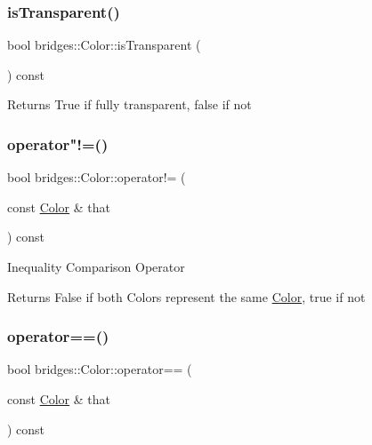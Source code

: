 \subsubsection{\texorpdfstring{is\+Transparent()}{isTransparent()}}
{\footnotesize\ttfamily bool bridges\+::\+Color\+::is\+Transparent (\begin{DoxyParamCaption}{ }\end{DoxyParamCaption}) const\hspace{0.3cm}{\ttfamily [inline]}}

\begin{DoxyReturn}{Returns}
True if fully transparent, false if not 
\end{DoxyReturn}
\mbox{\label{classbridges_1_1_color_abe4ff1e5d4c6a33b2e9715be57ae0dce}} 
\subsubsection{\texorpdfstring{operator"!=()}{operator!=()}}
{\footnotesize\ttfamily bool bridges\+::\+Color\+::operator!= (\begin{DoxyParamCaption}\item[{const \mbox{\hyperlink{classbridges_1_1_color}{Color}} \&}]{that }\end{DoxyParamCaption}) const\hspace{0.3cm}{\ttfamily [inline]}}

Inequality Comparison Operator \begin{DoxyReturn}{Returns}
False if both Colors represent the same \mbox{\hyperlink{classbridges_1_1_color}{Color}}, true if not 
\end{DoxyReturn}
\mbox{\label{classbridges_1_1_color_a9b33b4ee063496691f8816504cc8b007}} 
\subsubsection{\texorpdfstring{operator==()}{operator==()}}
{\footnotesize\ttfamily bool bridges\+::\+Color\+::operator== (\begin{DoxyParamCaption}\item[{const \mbox{\hyperlink{classbridges_1_1_color}{Color}} \&}]{that }\end{DoxyParamCaption}) const\hspace{0.3cm}{\ttfamily [inline]}}

